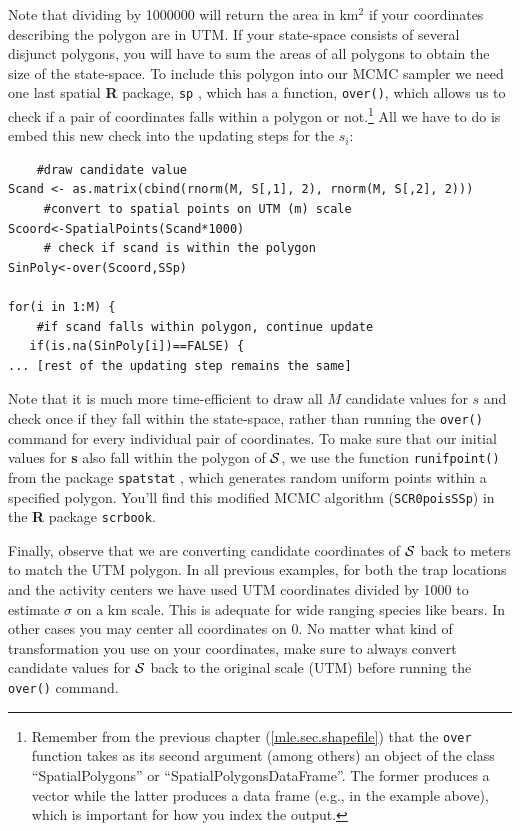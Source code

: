  Note that dividing by 1000000 will return the area in km$^2$ if your coordinates describing the polygon are in UTM. If your state-space consists of several disjunct polygons, you will have to sum the areas of all polygons to obtain the size of the state-space.
To include this polygon into our MCMC sampler we need one last spatial 
{\bf R} package, \mbox{\tt sp} \citep{pebesma_bivand:2011}, which has a 
function, \verb#over()#, which allows us to check if a pair of coordinates 
falls within a polygon or not.\footnote{Remember from the previous chapter (\ref{mle.sec.shapefile}) that the {\tt over} function takes as its second argument (among others) an object of the class ``SpatialPolygons'' or ``SpatialPolygonsDataFrame''. The former produces a vector while the latter produces a data frame (e.g., in the example above), which is important for how you index the output.} All we have to do is embed this new check 
into the updating steps for the $s_i$:
\begin{verbatim}
    #draw candidate value
Scand <- as.matrix(cbind(rnorm(M, S[,1], 2), rnorm(M, S[,2], 2)))
     #convert to spatial points on UTM (m) scale
Scoord<-SpatialPoints(Scand*1000)   
     # check if scand is within the polygon
SinPoly<-over(Scoord,SSp)		

for(i in 1:M) {
    #if scand falls within polygon, continue update
   if(is.na(SinPoly[i])==FALSE) {		
... [rest of the updating step remains the same]
\end{verbatim}
Note that it is much more time-efficient to draw all $M$ candidate values 
for {\bf $s$} and check once if they fall within the state-space, rather than 
running the \verb#over()# command for every individual pair of 
coordinates. To make sure that our initial values for {\bf s} also fall 
within the polygon of ${\cal S}$, we use the function \verb#runifpoint()# 
from the package \mbox{\tt spatstat} \citep{baddeley_turner:2005}, 
which generates random uniform points within a specified polygon. You'll 
find this modified MCMC algorithm (\mbox{\tt SCR0poisSSp}) in the {\bf R} 
package \mbox{\tt scrbook}.

Finally, observe that we are converting candidate coordinates of ${\cal S}$ 
back to meters to match the UTM polygon. In all previous examples, 
for both the trap locations and the activity centers we have used UTM 
coordinates divided by 1000 to estimate $\sigma$ on a km scale. This is 
adequate for wide ranging species like bears. In other cases you 
may center all coordinates on 0. No matter what kind of transformation you 
use on your coordinates, make sure to always convert candidate values for 
${\cal S}$ back to the original scale (UTM) before running the 
\verb#over()# command.

